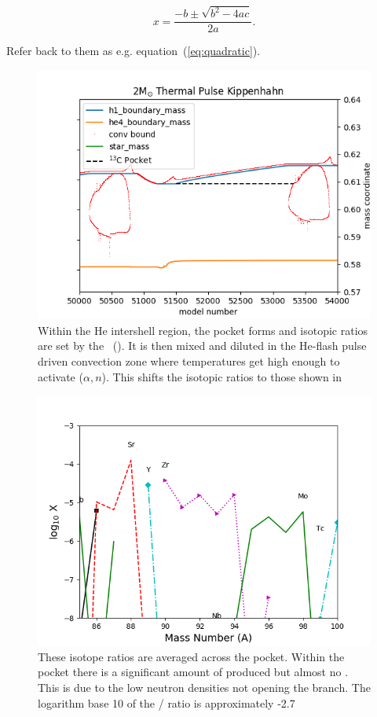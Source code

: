 \documentclass[fleqn,usenatbib]{mnras}
\begin{document}
\begin{equation}
    x=\frac{-b\pm\sqrt{b^2-4ac}}{2a}.
	\label{eq:quadratic}
\end{equation}

Refer back to them as e.g. equation~(\ref{eq:quadratic}).

\begin{figure}
  \includegraphics[width=\columnwidth]{figs/2M_Kippenhahn.png}
  \caption{Within the He intershell region, the \carbon[13] pocket forms and isotopic ratios are set by the \spr~(). It is then mixed and diluted in the He-flash pulse driven convection zone where temperatures get high enough to activate \neon[22]($\alpha,n$)\magnesium[25]. This shifts the isotopic ratios to those shown in } 
\end{figure}

\begin{figure}
  \includegraphics[width=\columnwidth]{figs/C13_Zr.png}
  \caption{These isotope ratios are averaged across the \carbon[13] pocket. Within the \carbon[13] pocket there is a significant amount of \zirconium[94] produced but almost no \zirconium[96]. This is due to the low neutron densities not opening the \zirconium[95] branch. The logarithm base 10 of the \zirconium[96] / \zirconium[94] ratio is approximately -2.7} 
\end{figure}
\end{document}
